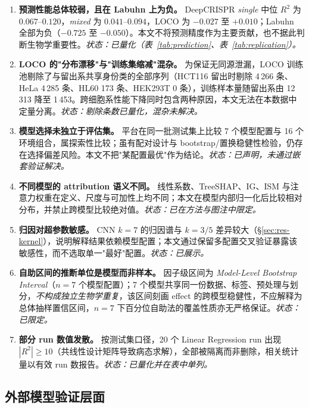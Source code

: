 \begin{enumerate}
\item \textbf{预测性能总体较弱，且在 Labuhn 上为负。} DeepCRISPR \emph{single} 中位 $R^{2}$ 为 $0.067$--$0.120$，\emph{mixed} 为 $0.041$--$0.094$，LOCO 为 $-0.027$ 至 $+0.010$；Labuhn 全部为负（$-0.725$ 至 $-0.050$）。本文不将预测精度作为主要贡献，也不据此判断生物学重要性。\emph{状态：已量化（表~\ref{tab:prediction}、表~\ref{tab:replication}）。}
\item \textbf{LOCO 的"分布漂移"与"训练集缩减"混杂。} 为保证无同源泄漏，LOCO 训练池剔除了与留出系共享身份类的全部序列（HCT116 留出时剔除 4\,266 条、HeLa 4\,285 条、HL60 173 条、HEK293T 0 条），训练样本量随留出系由 12\,313 降至 1\,453。跨细胞系性能下降同时包含两种原因，本文无法在本数据中定量分离。\emph{状态：剔除条数已量化，混杂未解决。}
\item \textbf{模型选择未独立于评估集。} 平台在同一批测试集上比较 7 个模型配置与 16 个环境组合，属探索性比较；虽有配对设计与 bootstrap/置换稳健性检验，仍存在选择偏差风险。本文不把"某配置最优"作为结论。\emph{状态：已声明，未通过嵌套验证解决。}
\item \textbf{不同模型的 attribution 语义不同。} 线性系数、TreeSHAP、IG、ISM 与注意力权重在定义、尺度与可加性上均不同；本文在模型内部归一化后比较相对分布，并禁止跨模型比较绝对值。\emph{状态：已在方法与图注中限定。}
\item \textbf{归因对超参数敏感。} CNN $k=7$ 的归因谱与 $k=3/5$ 差异较大（\S\ref{sec:res-kernel}），说明解释结果依赖模型配置；本文通过保留多配置交叉验证暴露该敏感性，而不选取单一"最好"配置。\emph{状态：已展示。}
\item \textbf{自助区间的推断单位是模型而非样本。} 因子级区间为 \emph{Model-Level Bootstrap Interval}（$n=7$ 个模型配置）；7 个模型共享同一份数据、标签、预处理与划分，\emph{不构成独立生物学重复}，该区间刻画 effect 的跨模型稳健性，不应解释为总体抽样置信区间，$n=7$ 下百分位自助法的覆盖性质亦无严格保证。\emph{状态：已限定。}
\item \textbf{部分 run 数值发散。} 按测试集口径，20 个 Linear Regression run 出现 $|R^{2}|\ge10$（共线性设计矩阵导致病态求解），全部被隔离而非删除，相关统计量以有效 run 数报告。\emph{状态：已量化并在表中单列。}
\end{enumerate}

\subsection{外部模型验证层面}

